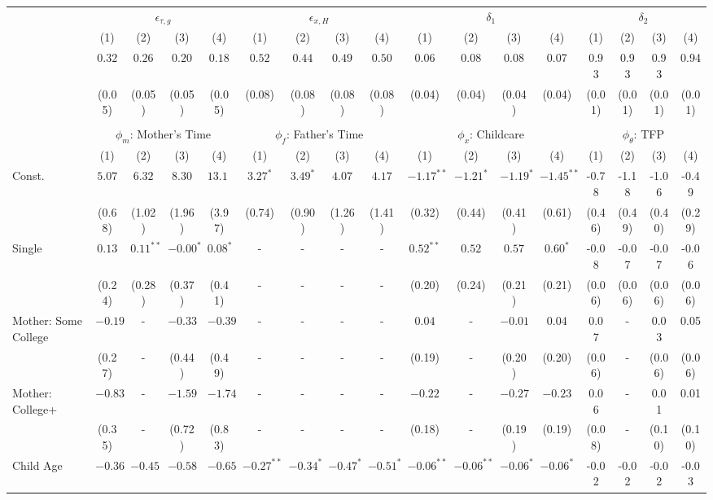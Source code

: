 \begin{tabular}{lcccccccccccccccc}\\\toprule
 & \multicolumn{4}{c}{$\epsilon_{\tau,g}$} & \multicolumn{4}{c}{$\epsilon_{x,H}$} & \multicolumn{4}{c}{$\delta_{1}$} & \multicolumn{4}{c}{$\delta_{2}$} \\
&(1)&(2)&(3)&(4)&(1)&(2)&(3)&(4)&(1)&(2)&(3)&(4)&(1)&(2)&(3)&(4)\\\cmidrule(r){2-5}\cmidrule(r){6-9}\cmidrule(r){10-13}\cmidrule(r){14-17}
&$0.32$&$0.26$&$0.20$&$0.18$&$0.52$&$0.44$&$0.49$&$0.50$&0.06&0.08&0.08&0.07&0.93&0.93&0.93&0.94\\
&(0.05)&(0.05)&(0.05)&(0.05)&(0.08)&(0.08)&(0.08)&(0.08)&(0.04)&(0.04)&(0.04)&(0.04)&(0.01)&(0.01)&(0.01)&(0.01)\\
&&&&&&&&&&&&&&&&\\
 & \multicolumn{4}{c}{$\phi_{m}$: Mother's Time} & \multicolumn{4}{c}{$\phi_{f}$: Father's Time} & \multicolumn{4}{c}{$\phi_{x}$: Childcare} & \multicolumn{4}{c}{$\phi_{\theta}$: TFP} \\
&(1)&(2)&(3)&(4)&(1)&(2)&(3)&(4)&(1)&(2)&(3)&(4)&(1)&(2)&(3)&(4)\\\cmidrule(r){2-5}\cmidrule(r){6-9}\cmidrule(r){10-13}\cmidrule(r){14-17}
Const.&$5.07$&$6.32$&$8.30$&$13.18$&$3.27^{*}$&$3.49^{*}$&$4.07$&$4.17$&$-1.17^{**}$&$-1.21^{*}$&$-1.19^{*}$&$-1.45^{**}$&-0.78&-1.18&-1.06&-0.49\\
&(0.68)&(1.02)&(1.96)&(3.97)&(0.74)&(0.90)&(1.26)&(1.41)&(0.32)&(0.44)&(0.41)&(0.61)&(0.46)&(0.49)&(0.40)&(0.29)\\
Single&$0.13$&$0.11^{**}$&$-0.00^{*}$&$0.08^{*}$&-&-&-&-&$0.52^{**}$&$0.52$&$0.57$&$0.60^{*}$&-0.08&-0.07&-0.07&-0.06\\
&(0.24)&(0.28)&(0.37)&(0.41)&-&-&-&-&(0.20)&(0.24)&(0.21)&(0.21)&(0.06)&(0.06)&(0.06)&(0.06)\\
Mother: Some College&$-0.19$&-&$-0.33$&$-0.39$&-&-&-&-&$0.04$&-&$-0.01$&$0.04$&0.07&-&0.03&0.05\\
&(0.27)&-&(0.44)&(0.49)&-&-&-&-&(0.19)&-&(0.20)&(0.20)&(0.06)&-&(0.06)&(0.06)\\
Mother: College+&$-0.83$&-&$-1.59$&$-1.74$&-&-&-&-&$-0.22$&-&$-0.27$&$-0.23$&0.06&-&0.01&0.01\\
&(0.35)&-&(0.72)&(0.83)&-&-&-&-&(0.18)&-&(0.19)&(0.19)&(0.08)&-&(0.10)&(0.10)\\
Child Age&$-0.36$&$-0.45$&$-0.58$&$-0.65$&$-0.27^{**}$&$-0.34^{*}$&$-0.47^{*}$&$-0.51^{*}$&$-0.06^{**}$&$-0.06^{**}$&$-0.06^{*}$&$-0.06^{*}$&-0.02&-0.02&-0.02&-0.03\\

\end{tabular}
